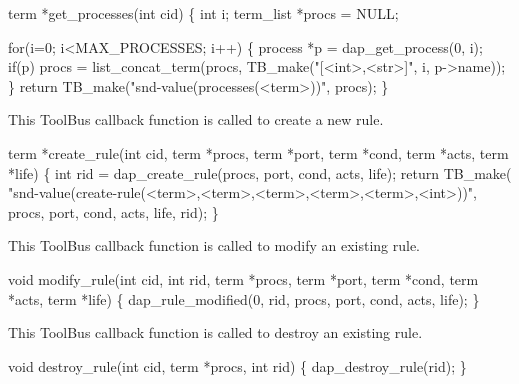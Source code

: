 \nwenddocs{}\endmoddef\let\nwnotused=\nwoutput{}
term *get_processes(int cid)
\{
  int i;
  term_list *procs = NULL;

  for(i=0; i<MAX_PROCESSES; i++) \{
    process *p = dap_get_process(0, i);
    if(p)
      procs = list_concat_term(procs, TB_make("[<int>,<str>]", i, p->name));
  \}
  return TB_make("snd-value(processes(<term>))", procs);
\}
\nwendcode{}\nwdocspar


This ToolBus callback function is called to create a new rule. 

\nwenddocs{}\endmoddef\let\nwnotused=\nwoutput{}
term *create_rule(int cid, term *procs, term *port, term *cond, term *acts, term *life)
\{
  int rid = dap_create_rule(procs, port, cond, acts, life);
  return TB_make(
        "snd-value(create-rule(<term>,<term>,<term>,<term>,<term>,<int>))",
        procs, port, cond, acts, life, rid);
\}
\nwendcode{}\nwdocspar


This ToolBus callback function is called to modify an existing rule. 

\nwenddocs{}\endmoddef\let\nwnotused=\nwoutput{}
void modify_rule(int cid, int rid, term *procs, term *port, 
                                term *cond, term *acts, term *life)
\{
  dap_rule_modified(0, rid, procs, port, cond, acts, life);
\}
\nwendcode{}\nwdocspar


This ToolBus callback function is called to destroy an existing rule.

\nwenddocs{}\endmoddef\let\nwnotused=\nwoutput{}
void destroy_rule(int cid, term *procs, int rid)
\{
  dap_destroy_rule(rid);
\}
\nwendcode{}\nwdocspar

